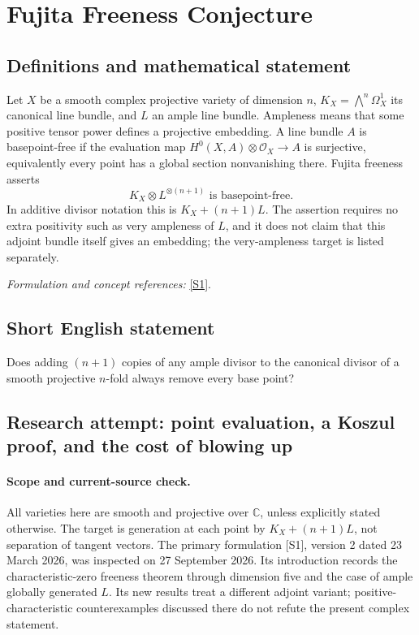 \documentclass[11pt]{article}
\begin{document}
\section*{\texorpdfstring{Fujita Freeness Conjecture}{Fujita Freeness Conjecture}}\label{30006886}
\subsection{Definitions and mathematical statement}
Let $X$ be a smooth complex projective variety of dimension $n$, $K_X=\bigwedge^n\Omega_X^1$ its canonical line bundle, and $L$ an ample line bundle. Ampleness means that some positive tensor power defines a projective embedding. A line bundle $A$ is basepoint-free if the evaluation map $H^0(X,A)\otimes\mathcal O_X\to A$ is surjective, equivalently every point has a global section nonvanishing there. Fujita freeness asserts
\[
 K_X\otimes L^{\otimes(n+1)}\text{ is basepoint-free}.
\]
In additive divisor notation this is $K_X+(n+1)L$. The assertion requires no extra positivity such as very ampleness of $L$, and it does not claim that this adjoint bundle itself gives an embedding; the very-ampleness target is listed separately.
\par\smallskip\textit{Formulation and concept references:} \href{https://arxiv.org/abs/2408.06530v2}{[S1]}.

\subsection{Short English statement}
Does adding $(n+1)$ copies of any ample divisor to the canonical divisor of a smooth projective $n$-fold always remove every base point?
\subsection{Research attempt: point evaluation, a Koszul proof, and the cost of blowing up}
\paragraph{Scope and current-source check.}
All varieties here are smooth and projective over $\mathbb C$, unless explicitly stated otherwise. The target is generation at each point by $K_X+(n+1)L$, not separation of tangent vectors. The primary formulation [S1], version 2 dated 23 March 2026, was inspected on 27 September 2026. Its introduction records the characteristic-zero freeness theorem through dimension five and the case of ample globally generated $L$. Its new results treat a different adjoint variant; positive-characteristic counterexamples discussed there do not refute the present complex statement.
\end{document}
